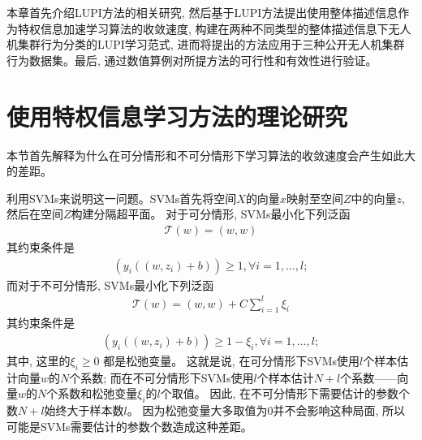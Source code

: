 本章首先介绍LUPI方法的相关研究, 然后基于LUPI方法提出使用整体描述信息作为特权信息加速学习算法的收敛速度, 构建在两种不同类型的整体描述信息下无人机集群行为分类的LUPI学习范式, 进而将提出的方法应用于三种公开无人机集群行为数据集。最后, 通过数值算例对所提方法的可行性和有效性进行验证。


\section{使用特权信息学习方法的理论研究}
本节首先解释为什么在可分情形和不可分情形下学习算法的收敛速度会产生如此大的差距。

利用SVMs来说明这一问题。SVMs首先将空间$X$的向量$x$映射至空间$Z$中的向量$z$, 然后在空间$Z$构建分隔超平面。 对于可分情形, SVMs最小化下列泛函
\begin{align}
\mathcal{T}(w) = (w, w)
\end{align}
其约束条件是
\begin{align}
(y_{i}((w, z_{i}) + b)) \geq 1, \forall i = 1, \ldots, l;
\end{align}
而对于不可分情形, SVMs最小化下列泛函
\begin{align}
\mathcal{T}(w) = (w, w) + C\sum_{i=1}^{l}\xi_{i}
\end{align}
其约束条件是
\begin{align}
(y_{i}((w, z_{i}) + b)) \geq 1 - \xi_{i}, \forall i = 1, \ldots, l;
\end{align}
其中, 这里的$\xi_{i} \geq 0$ 都是松弛变量。 这就是说, 在可分情形下SVMs使用$l$个样本估计向量$w$的$N$个系数; 而在不可分情形下SVMs使用$l$个样本估计$N+l$个系数——向量$w$的$N$个系数和松弛变量$\xi_{i}$的$l$个取值。 因此, 在不可分情形下需要估计的参数个数$N+l$始终大于样本数$l$。 因为松弛变量大多取值为0并不会影响这种局面, 所以可能是SVMs需要估计的参数个数造成这种差距。

